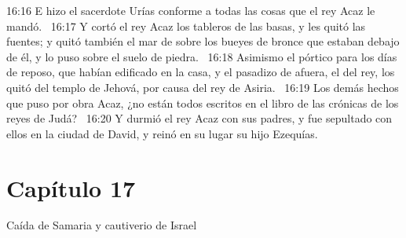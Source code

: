 16:16 E hizo el sacerdote Urías conforme a todas las cosas que el rey Acaz le mandó.  
16:17 Y cortó el rey Acaz los tableros de las basas, y les quitó las fuentes; y quitó también el mar de sobre los bueyes de bronce que estaban debajo de él, y lo puso sobre el suelo de piedra.  
16:18 Asimismo el pórtico para los días de reposo, que habían edificado en la casa, y el pasadizo de afuera, el del rey, los quitó del templo de Jehová, por causa del rey de Asiria.  
16:19 Los demás hechos que puso por obra Acaz, ¿no están todos escritos en el libro de las crónicas de los reyes de Judá?  
16:20 Y durmió el rey Acaz con sus padres, y fue sepultado con ellos en la ciudad de David, y reinó en su lugar su hijo Ezequías.  
\section*{Capítulo 17 }
Caída de Samaria y cautiverio de Israel  

